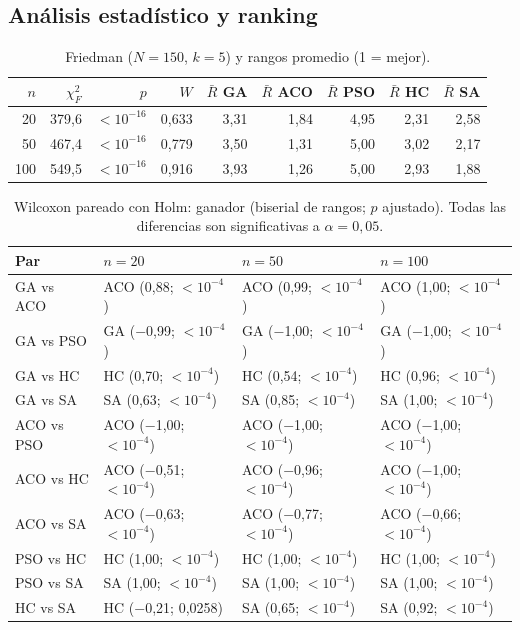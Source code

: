 \documentclass[10pt,a4paper]{article}
\begin{document}
\subsection{Análisis estadístico y ranking}
\begin{table}[H]\centering\small
\begin{tabular}{rrrrrrrrr}
\toprule
$n$ & $\chi^2_F$ & $p$ & $W$ & $\bar R$ GA & $\bar R$ ACO & $\bar R$ PSO & $\bar R$ HC & $\bar R$ SA \\
\midrule
20 & 379{,}6 & $<10^{-16}$ & 0{,}633 & 3{,}31 & 1{,}84 & 4{,}95 & 2{,}31 & 2{,}58 \\
\midrule
50 & 467{,}4 & $<10^{-16}$ & 0{,}779 & 3{,}50 & 1{,}31 & 5{,}00 & 3{,}02 & 2{,}17 \\
\midrule
100 & 549{,}5 & $<10^{-16}$ & 0{,}916 & 3{,}93 & 1{,}26 & 5{,}00 & 2{,}93 & 1{,}88 \\
\bottomrule
\end{tabular}

\caption{Friedman ($N=150$, $k=5$) y rangos promedio (1 = mejor).}\label{tab:fried}
\end{table}
\begin{table}[H]\centering\footnotesize
\begin{tabular}{llll}
\toprule
Par & $n=20$ & $n=50$ & $n=100$ \\
\midrule
GA vs ACO & ACO (0{,}88; $<10^{-4}$) & ACO (0{,}99; $<10^{-4}$) & ACO (1{,}00; $<10^{-4}$) \\
GA vs PSO & GA ($-$0{,}99; $<10^{-4}$) & GA ($-$1{,}00; $<10^{-4}$) & GA ($-$1{,}00; $<10^{-4}$) \\
GA vs HC & HC (0{,}70; $<10^{-4}$) & HC (0{,}54; $<10^{-4}$) & HC (0{,}96; $<10^{-4}$) \\
GA vs SA & SA (0{,}63; $<10^{-4}$) & SA (0{,}85; $<10^{-4}$) & SA (1{,}00; $<10^{-4}$) \\
ACO vs PSO & ACO ($-$1{,}00; $<10^{-4}$) & ACO ($-$1{,}00; $<10^{-4}$) & ACO ($-$1{,}00; $<10^{-4}$) \\
ACO vs HC & ACO ($-$0{,}51; $<10^{-4}$) & ACO ($-$0{,}96; $<10^{-4}$) & ACO ($-$1{,}00; $<10^{-4}$) \\
ACO vs SA & ACO ($-$0{,}63; $<10^{-4}$) & ACO ($-$0{,}77; $<10^{-4}$) & ACO ($-$0{,}66; $<10^{-4}$) \\
PSO vs HC & HC (1{,}00; $<10^{-4}$) & HC (1{,}00; $<10^{-4}$) & HC (1{,}00; $<10^{-4}$) \\
PSO vs SA & SA (1{,}00; $<10^{-4}$) & SA (1{,}00; $<10^{-4}$) & SA (1{,}00; $<10^{-4}$) \\
HC vs SA & HC ($-$0{,}21; 0{,}0258) & SA (0{,}65; $<10^{-4}$) & SA (0{,}92; $<10^{-4}$) \\
\bottomrule
\end{tabular}

\caption{Wilcoxon pareado con Holm: ganador (biserial de rangos; $p$ ajustado). Todas las diferencias son significativas a $\alpha=0{,}05$.}\label{tab:ph}
\end{table}
\end{document}
